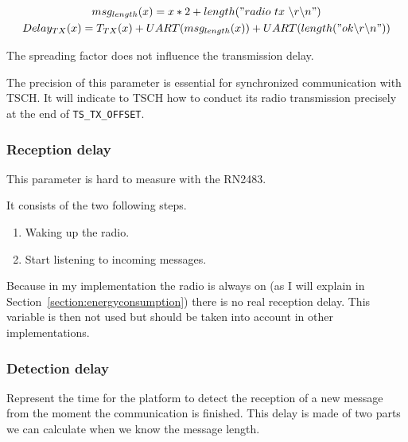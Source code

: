 \begin{gather}
  \label{eq:transmissiondelay}
  msg_{length}(x) = x * 2 + length("radio~tx~\backslash r \backslash n") \\
  Delay_{TX}(x) = T_{TX}(x) + UART(msg_{length}(x)) + UART(length("ok \backslash r\backslash n"))
\end{gather}

The spreading factor does not influence the transmission delay.

The precision of this parameter is essential for synchronized communication
with TSCH. It will indicate to TSCH how to conduct its radio transmission
precisely at the end of \lstinline{TS_TX_OFFSET}.

\subsubsection{Reception delay}

This parameter is hard to measure with the RN2483.

It consists of the two following steps.

\begin{enumerate}
  \item Waking up the radio.
  \item Start listening to incoming messages.
\end{enumerate}

Because in my implementation the radio is always on (as I will explain in
Section~\ref{section:energyconsumption}) there is no real reception
delay.
This variable is then not used but should be taken into account in other
implementations.

\subsubsection{Detection delay\label{section:detectiondelay}}


Represent the time for the platform to detect the reception of a new message
from the moment the communication is finished.
This delay is made of two parts we can calculate when we know the message
length.

